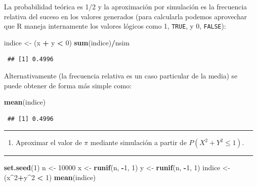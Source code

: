 \documentclass[
  spanish,
  10pt,
]{book}
\newenvironment{Shaded}{\begin{snugshade}}{\end{snugshade}}
\newcommand{\DecValTok}[1]{\textcolor[rgb]{0.00,0.00,0.81}{#1}}
\newcommand{\FunctionTok}[1]{\textcolor[rgb]{0.13,0.29,0.53}{\textbf{#1}}}
\newcommand{\NormalTok}[1]{#1}
\newcommand{\OtherTok}[1]{\textcolor[rgb]{0.56,0.35,0.01}{#1}}
\newcommand{\SpecialCharTok}[1]{\textcolor[rgb]{0.81,0.36,0.00}{\textbf{#1}}}
\providecommand{\tightlist}{%
  \setlength{\itemsep}{0pt}\setlength{\parskip}{0pt}}
\theoremstyle{break}
\theoremstyle{nonumberplain}
\begin{document}
La probabilidad teórica es 1/2 y la aproximación por simulación es la frecuencia relativa del suceso en los valores generados (para calcularla podemos aprovechar que R maneja internamente los valores lógicos como 1, \texttt{TRUE}, y 0, \texttt{FALSE}):

\begin{Shaded}
\begin{Highlighting}[]
\NormalTok{indice }\OtherTok{\textless{}{-}}\NormalTok{ (x }\SpecialCharTok{+}\NormalTok{ y }\SpecialCharTok{\textless{}} \DecValTok{0}\NormalTok{)}
\FunctionTok{sum}\NormalTok{(indice)}\SpecialCharTok{/}\NormalTok{nsim}
\end{Highlighting}
\end{Shaded}

\begin{verbatim}
 ## [1] 0.4996
\end{verbatim}

Alternativamente (la frecuencia relativa es un caso particular de la media) se puede obtener de forma más simple como:

\begin{Shaded}
\begin{Highlighting}[]
\FunctionTok{mean}\NormalTok{(indice)}
\end{Highlighting}
\end{Shaded}

\begin{verbatim}
 ## [1] 0.4996
\end{verbatim}

\begin{center}\rule{0.5\linewidth}{0.5pt}\end{center}

\begin{enumerate}
\def\labelenumi{\alph{enumi})}
\setcounter{enumi}{1}
\tightlist
\item
  Aproximar el valor de \(\pi\) mediante simulación a partir de
  \(P\left( X^2 +Y^2 \leq 1 \right)\).
\end{enumerate}

\begin{center}\rule{0.5\linewidth}{0.5pt}\end{center}

\begin{Shaded}
\begin{Highlighting}[]
\FunctionTok{set.seed}\NormalTok{(}\DecValTok{1}\NormalTok{)}
\NormalTok{n }\OtherTok{\textless{}{-}} \DecValTok{10000}
\NormalTok{x }\OtherTok{\textless{}{-}} \FunctionTok{runif}\NormalTok{(n, }\SpecialCharTok{{-}}\DecValTok{1}\NormalTok{, }\DecValTok{1}\NormalTok{)}
\NormalTok{y }\OtherTok{\textless{}{-}} \FunctionTok{runif}\NormalTok{(n, }\SpecialCharTok{{-}}\DecValTok{1}\NormalTok{, }\DecValTok{1}\NormalTok{)}
\NormalTok{indice }\OtherTok{\textless{}{-}}\NormalTok{ (x}\SpecialCharTok{\^{}}\DecValTok{2}\SpecialCharTok{+}\NormalTok{y}\SpecialCharTok{\^{}}\DecValTok{2} \SpecialCharTok{\textless{}} \DecValTok{1}\NormalTok{)}
\FunctionTok{mean}\NormalTok{(indice)}
\end{Highlighting}
\end{Shaded}
\end{document}
